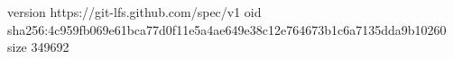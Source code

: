 version https://git-lfs.github.com/spec/v1
oid sha256:4c959fb069e61bca77d0f11e5a4ae649e38c12e764673b1c6a7135dda9b10260
size 349692
